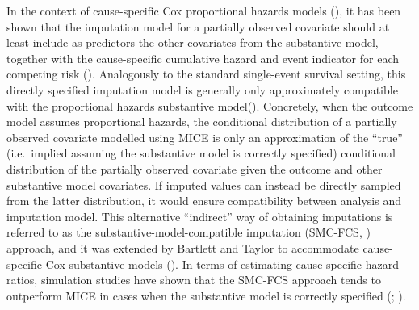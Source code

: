 \documentclass[
  letterpaper,
  DIV=11,
  numbers=noendperiod]{scrreprt}
\begin{document}
In the context of cause-specific Cox proportional hazards models
(), it has been shown that the imputation model for a partially
observed covariate should at least include as predictors the other
covariates from the substantive model, together with the cause-specific
cumulative hazard and event indicator for each competing risk
(). Analogously to the standard single-event survival
setting, this directly specified imputation model is generally only
approximately compatible with the proportional hazards substantive
model(). Concretely, when the outcome model assumes proportional
hazards, the conditional distribution of a partially observed covariate
modelled using MICE is only an approximation of the ``true''
(i.e.~implied assuming the substantive model is correctly specified)
conditional distribution of the partially observed covariate given the
outcome and other substantive model covariates. If imputed values can
instead be directly sampled from the latter distribution, it would
ensure compatibility between analysis and imputation model. This
alternative ``indirect'' way of obtaining imputations is referred to as
the substantive-model-compatible imputation (SMC-FCS,
) approach, and it was extended by Bartlett and
Taylor to accommodate cause-specific Cox substantive models
(). In terms of estimating cause-specific hazard ratios,
simulation studies have shown that the SMC-FCS approach tends to
outperform MICE in cases when the substantive model is correctly
specified
(;
).
\end{document}
